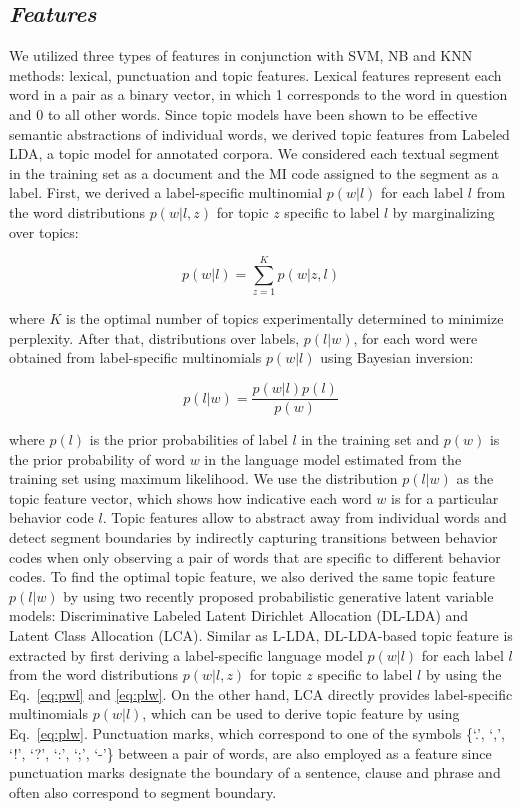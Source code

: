 \documentclass{amia}
\begin{document}
\subsection*{\textit{Features}}

We utilized three types of features in conjunction with SVM, NB and KNN methods: lexical, punctuation and topic features. Lexical features represent each word in a pair as a binary vector, in which 1 corresponds to the word in question and 0 to all other words. Since topic models\cite{kotov2015interpretable,hashimoto2016topic,lu2016modeling} have been shown to be effective semantic abstractions of individual words, we derived topic features from Labeled LDA\cite{ramage2009labeled}, a topic model for annotated corpora. We considered each textual segment in the training set as a document and the MI code assigned to the segment as a label. First, we derived a label-specific multinomial $p(w|l)$ for each label $l$ from the word distributions $p(w|l,z)$ for topic $z$ specific to label $l$ by marginalizing over topics: 

\begin{equation}
\label{eq:pwl}
p(w|l) = {\sum_{z=1}^{K}{p(w|z,l)}}
\end{equation}

where $K$ is the optimal number of topics experimentally determined to minimize perplexity. After that, distributions over labels, $p(l|w)$, for each word were obtained from label-specific multinomials $p(w|l)$ using Bayesian inversion: 

\begin{equation}
\label{eq:plw}
p(l|w) = \frac{p(w|l)p(l)}{p(w)}
\end{equation}

where $p(l)$ is the prior probabilities of label $l$ in the training set and $p(w)$ is the prior probability of word $w$ in the language model estimated from the training set using maximum likelihood. We use the distribution $p(l|w)$ as the topic feature vector, which shows how indicative each word $w$ is for a particular behavior code $l$. Topic features allow to abstract away from individual words and detect segment boundaries by indirectly capturing transitions between behavior codes when only observing a pair of words that are specific to different behavior codes. To find the optimal topic feature, we also derived the same topic feature $p(l|w)$ by using two recently proposed probabilistic generative latent variable models: Discriminative Labeled Latent Dirichlet Allocation (DL-LDA) and Latent Class Allocation (LCA)\cite{kotov2015interpretable}. Similar as L-LDA, DL-LDA-based topic feature is extracted by first deriving a label-specific language model $p(w|l)$ for each label $l$ from the word distributions $p(w|l,z)$ for topic $z$ specific to label $l$ by using the Eq.~\ref{eq:pwl} and \ref{eq:plw}. On the other hand, LCA directly provides label-specific multinomials $p(w|l)$, which can be used to derive topic feature by using Eq.~\ref{eq:plw}. Punctuation marks, which correspond to one of the symbols \{`.', `,', `!', `?', `:', `;', `-'\} between a pair of words, are also employed as a feature since punctuation marks designate the boundary of a sentence, clause and phrase and often also correspond to segment boundary.   
\end{document}
